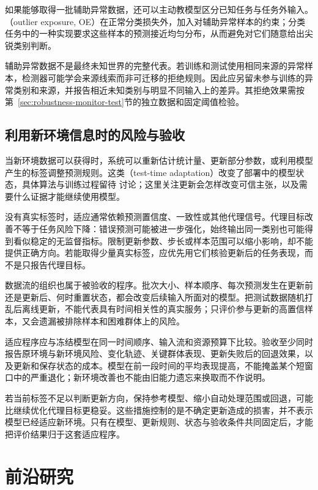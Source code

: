 如果能够取得一批辅助异常数据，还可以主动教模型区分已知任务与任务外输入。（outlier exposure, OE）在正常分类损失外，加入对辅助异常样本的约束；分类任务中的一种实现要求这些样本的预测接近均匀分布，从而避免对它们随意给出尖锐类别判断。

辅助异常数据不是最终未知世界的完整代表。若训练和测试使用相同来源的异常样本，检测器可能学会来源线索而非可迁移的拒绝规则。因此应另留未参与训练的异常类别和来源，并报告相近未知类别与明显不同输入上的差异。其拒绝效果需按第~\ref{sec:robustness-monitor-test}节的独立数据和固定阈值检验。

\subsection{利用新环境信息时的风险与验收}
\label{sec:robustness-adaptation}

当新环境数据可以获得时，系统可以重新估计统计量、更新部分参数，或利用模型产生的标签调整预测规则。这类（test-time adaptation）改变了部署中的模型状态，具体算法与训练过程留待
讨论；这里关注更新会怎样改变可信主张，以及需要什么证据才能继续使用模型。

没有真实标签时，适应通常依赖预测置信度、一致性或其他代理信号。代理目标改善不等于任务风险下降：错误预测可能被进一步强化，始终输出同一类别也可能得到看似稳定的无监督指标。限制更新参数、步长或样本范围可以缩小影响，却不能提供正确方向。若能取得少量真实标签，应优先用它们核验更新后的任务表现，而不是只报告代理目标。

数据流的组织也属于被验收的程序。批次大小、样本顺序、每次预测发生在更新前还是更新后、何时重置状态，都会改变后续输入所面对的模型。把测试数据随机打乱后离线更新，不能代表具有时间相关性的真实服务；只评价参与更新的高置信样本，又会遗漏被排除样本和困难群体上的风险。

适应程序应与冻结模型在同一时间顺序、输入流和资源预算下比较。验收至少同时报告原环境与新环境风险、变化轨迹、关键群体表现、更新失败后的回退效果，以及更新和保存状态的成本。模型在前一段时间的平均表现提高，不能掩盖某个短窗口中的严重退化；新环境改善也不能由旧能力遗忘来换取而不作说明。

若当前标签不足以判断更新方向，保持参考模型、缩小自动处理范围或回退，可能比继续优化代理目标更稳妥。这些措施控制的是不确定更新造成的损害，并不表示模型已经适应新环境。只有在模型、更新规则、状态与验收条件共同固定后，才能把评价结果归于这套适应程序。

\section{前沿研究}
\label{sec:robustness-frontiers}

